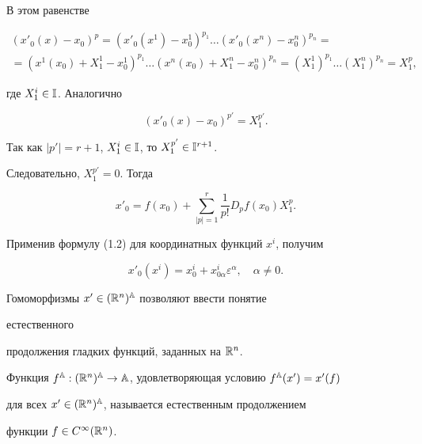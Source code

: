 В этом равенстве 


\begin{multline*} 


(x'_0(x)-x_0)^p=(x'_0(x^1)-x^1_0)^{p_1}\dotsc 


(x'_0(x^n)-x^n_0)^{p_n}= \\


=(x^1(x_0)+X^1_1-x^1_0)^{p_1}\dotsc 


(x^n(x_0)+X^n_1-x^n_0)^{p_n}=(X^1_1)^{p_1}\dotsc 


(X^n_1)^{p_n}=X^p_1, 


\end{multline*}  


где $X^i_1\in\Bbb I$. Аналогично 


$$ 


(x'_0(x)-x_0)^{p'}=X^{p'}_1. 


$$ 


Так как $|p'|=r+1$, $X^i_1\in\Bbb I$, то $X^{p'}_1\in\Bbb I^{r+1}$. 


Следовательно, $X^{p'}_1=0$. Тогда  


\begin{equation} 


x'_0=f(x_0)+\sum^r_{|p|=1}\frac{1}{p!}D_p f(x_0)X^p_1. 


\end{equation} 


Применив формулу (1.2) для координатных функций $x^i$, получим 


$$ 


x'_0(x^i)=x^i_0+x^i_{0\alpha}\varepsilon^\alpha,\quad \alpha\ne 0. 


$$ 


 


Гомоморфизмы $x'\in(\Bbb R^n)^{\Bbb A}$ позволяют ввести понятие 


естественного 


продолжения гладких функций, заданных на $\Bbb R^n$. 


 


\begin{defns} Функция $f\A:(\Bbb 


R^n)\A\to\Bbb A$, удовлетворяющая условию $f\A(x')=x'(f)$ 


для всех $x'\in(\Bbb R^n)^{\Bbb A}$, называется естественным продолжением 


функции $f\in C^\infty(\Bbb R^n)$. 


\end{defns} 


